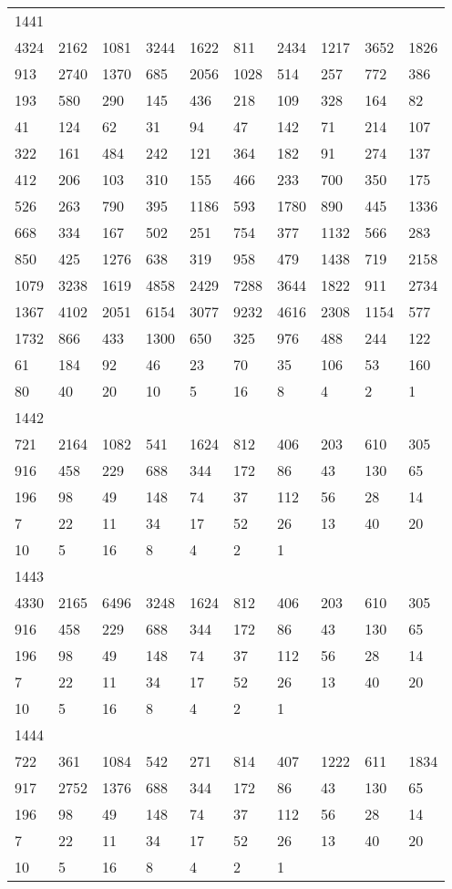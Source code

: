\begin{longtable}{*{10}{l}}
1441&&&&&&&&&\\
4324& 2162& 1081& 3244& 1622& 811& 2434& 1217& 3652& 1826\\
913& 2740& 1370& 685& 2056& 1028& 514& 257& 772& 386\\
193& 580& 290& 145& 436& 218& 109& 328& 164& 82\\
41& 124& 62& 31& 94& 47& 142& 71& 214& 107\\
322& 161& 484& 242& 121& 364& 182& 91& 274& 137\\
412& 206& 103& 310& 155& 466& 233& 700& 350& 175\\
526& 263& 790& 395& 1186& 593& 1780& 890& 445& 1336\\
668& 334& 167& 502& 251& 754& 377& 1132& 566& 283\\
850& 425& 1276& 638& 319& 958& 479& 1438& 719& 2158\\
1079& 3238& 1619& 4858& 2429& 7288& 3644& 1822& 911& 2734\\
1367& 4102& 2051& 6154& 3077& 9232& 4616& 2308& 1154& 577\\
1732& 866& 433& 1300& 650& 325& 976& 488& 244& 122\\
61& 184& 92& 46& 23& 70& 35& 106& 53& 160\\
80& 40& 20& 10& 5& 16& 8& 4& 2& 1\\

1442&&&&&&&&&\\
721& 2164& 1082& 541& 1624& 812& 406& 203& 610& 305\\
916& 458& 229& 688& 344& 172& 86& 43& 130& 65\\
196& 98& 49& 148& 74& 37& 112& 56& 28& 14\\
7& 22& 11& 34& 17& 52& 26& 13& 40& 20\\
10& 5& 16& 8& 4& 2& 1& \\

1443&&&&&&&&&\\
4330& 2165& 6496& 3248& 1624& 812& 406& 203& 610& 305\\
916& 458& 229& 688& 344& 172& 86& 43& 130& 65\\
196& 98& 49& 148& 74& 37& 112& 56& 28& 14\\
7& 22& 11& 34& 17& 52& 26& 13& 40& 20\\
10& 5& 16& 8& 4& 2& 1& \\

1444&&&&&&&&&\\
722& 361& 1084& 542& 271& 814& 407& 1222& 611& 1834\\
917& 2752& 1376& 688& 344& 172& 86& 43& 130& 65\\
196& 98& 49& 148& 74& 37& 112& 56& 28& 14\\
7& 22& 11& 34& 17& 52& 26& 13& 40& 20\\
10& 5& 16& 8& 4& 2& 1& \\


\end{longtable}
